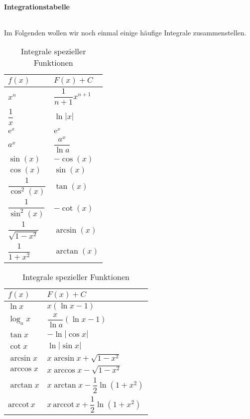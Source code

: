 \paragraph{Integrationstabelle}$~$

Im Folgenden wollen wir noch einmal einige häufige Integrale zusammenstellen.
\begin{table}[htp]
    \centering
    \caption{Integrale spezieller Funktionen}
    \begin{tabular}[t]{l l}
        \toprule
        $f(x)$ & $F(x) + C$ \\
        \midrule 
        $x^n$ & $\dfrac{1}{n+1} x^{n+1}$ \\
        $\dfrac{1}{x}$ & $\ln|x|$ \\[2mm]
        $\mathrm{e}^x$ & $\mathrm{e}^x$ \\
        $a^x$ & $\dfrac{a^x}{\ln a}$ \\[2mm]
        $\sin(x)$ & $-\cos(x)$ \\
        $\cos(x)$ & $\sin(x)$ \\
        $\dfrac{1}{\cos^2(x)}$ & $\tan(x)$ \\
        $\dfrac{1}{\sin^2(x)}$ & $-\cot(x)$ \\
        $\dfrac{1}{\sqrt{1-x^2}}$ & $\arcsin(x)$ \\
        $\dfrac{1}{1+x^2}$ & $\arctan(x)$ \\
    \end{tabular}
    \hspace{1cm}
    \begin{tabular}[t]{l l}
        \toprule
        $f(x)$ & $F(x) + C$ \\
        \midrule 
        $\ln x$ & $x(\ln x- 1)$ \\[2mm]
        $\log_a x$ & $\dfrac{x}{\ln a}(\ln x- 1)$ \\[2mm]
        $\tan x$ & $-\ln|\cos x|$ \\[2mm]
        $\cot x$ & $\ln|\sin x|$ \\[2mm] 
        $\arcsin x$ & $x \arcsin x + \sqrt{1-x^2}$ \\[2mm]
        $\arccos x$ & $x \arccos x - \sqrt{1-x^2}$ \\[2mm]
        $\arctan x$ & $x \arctan x - \dfrac{1}{2} \ln(1+x^2)$\\[2mm]
        $\text{arccot} \,x$ & $x \,\text{arccot}\, x + \dfrac{1}{2} \ln(1+x^2)$
    \end{tabular}
\end{table}